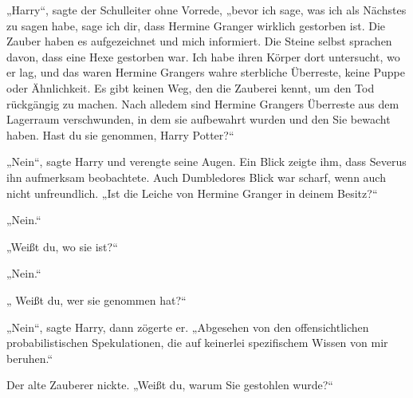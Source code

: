 „Harry“, sagte der Schulleiter ohne Vorrede, „bevor ich sage, was ich als Nächstes zu sagen habe, sage ich dir, dass Hermine Granger wirklich gestorben ist. Die Zauber haben es aufgezeichnet und mich informiert. Die Steine selbst sprachen davon, dass eine Hexe gestorben war. Ich habe ihren Körper dort untersucht, wo er lag, und das waren Hermine Grangers wahre sterbliche Überreste, keine Puppe oder Ähnlichkeit. Es gibt keinen Weg, den die Zauberei kennt, um den Tod rückgängig zu machen. Nach alledem sind Hermine Grangers Überreste aus dem Lagerraum verschwunden, in dem sie aufbewahrt wurden und den Sie bewacht haben. Hast du sie genommen, Harry Potter?“


„Nein“, sagte Harry und verengte seine Augen.
Ein Blick zeigte ihm, dass Severus ihn aufmerksam beobachtete. Auch Dumbledores Blick war scharf, wenn auch nicht unfreundlich. „Ist die Leiche von Hermine Granger in deinem Besitz?“

„Nein.“

„Weißt du, wo sie ist?“

„Nein.“

„ Weißt du, wer sie genommen hat?“

„Nein“, sagte Harry, dann zögerte er. „Abgesehen von den offensichtlichen probabilistischen Spekulationen, die auf keinerlei spezifischem Wissen von mir beruhen.“

Der alte Zauberer nickte.
„Weißt du, warum Sie gestohlen wurde?“


